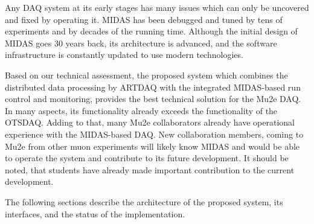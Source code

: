 \documentclass[12pt]{article}
\begin{document}
Any DAQ system at its early stages has many issues which can only be uncovered and fixed
by operating it. MIDAS has been debugged and tuned by tens of experiments
and by decades of the running time. Although the initial design of MIDAS goes 30 years back,
its architecture is advanced, and the software infrastructure is constantly updated
to use modern technologies.

Based on our technical assessment, the proposed system which combines
the distributed data processing by ARTDAQ with the integrated MIDAS-based
run control and monitoring, provides the best technical solution for the Mu2e DAQ.
In many aspects, its functionality already exceeds the functionality of the OTSDAQ.
%
Adding to that, many Mu2e collaborators already have operational experience with
the MIDAS-based DAQ. New collaboration members, coming to Mu2e from other muon 
experiments will likely know MIDAS and would be able to operate the system and
contribute to its future development.
It should be noted, that students have already made important contribution
to the current development.

The following sections describe the architecture of the proposed system,
its interfaces, and the status of the implementation.





% 





%
\newpage



% 

\end{document}
